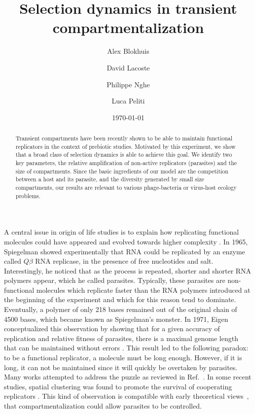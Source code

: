 \documentclass[twocolumn,showpacs,floatfix]{revtex4-1}
\begin{document}
\title{Selection dynamics in transient compartmentalization}
\author{Alex Blokhuis}
\author{David Lacoste}
\author{Philippe
 Nghe}
\author{Luca Peliti}
\date{\today} 

\begin{abstract}
Transient compartments have been recently shown to be able to 
maintain functional replicators in the context of prebiotic studies.
Motivated by this experiment, we show that a broad class of selection dynamics is
able to achieve this goal. We identify two key parameters, 
the relative amplification of non-active replicators (parasites) and 
the size of compartments. Since the basic ingredients of our model are the competition between a host and its parasite, 
and the diversity generated by small size compartments,
our results are relevant  
to various phage-bacteria or virus-host ecology problems. 



\end{abstract}


\maketitle


A central issue in origin of life studies is to explain how replicating functional molecules could have appeared and evolved 
towards higher complexity \cite{Higgs2015}.
In 1965, Spiegelman showed experimentally that RNA could be replicated by an enzyme called $Q\beta$ RNA replicase, 
in the presence of free nucleotides and salt. Interestingly, he noticed that as the process is repeated, shorter and shorter
RNA polymers appear, which he called parasites. Typically, these parasites are non-functional molecules which replicate faster than the 
RNA polymers introduced at the beginning of the experiment and which for this reason tend to dominate. 
Eventually, a polymer of only 218 bases remained out of the original chain of 4500 bases, which became known as Spiegelman's monster.
In 1971, Eigen conceptualized this observation by showing that for a given accuracy of replication and relative fitness of parasites, 
there is a maximal genome length that can be maintained without errors \cite{Eigen1971}. This result led to the following 
paradox: to be a functional replicator, a molecule must be long enough. However, if it is long, it can not be maintained since  
it will quickly be overtaken by parasites. 
Many works attempted to address the puzzle as reviewed in Ref.~\cite{Takeuchi2012}. 
In some recent studies, spatial clustering was found to promote the survival of cooperating 
replicators \cite{Levin2017,Tupper2017, Kim2016}.
This kind of observation is compatible with early theoretical views~\cite{Szathmary1987,Smith1995}, that compartmentalization could allow parasites to be controlled. 
\end{document}

